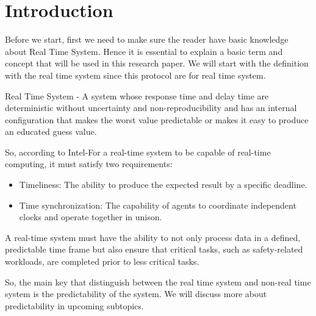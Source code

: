 \section{Introduction}

Before we start, first we need to make sure the reader have basic knowledge about Real Time System. Hence it is essential to explain a basic term and concept that will be used in this research paper. We will start with the definition with the real time system since this protocol are for real time system.\par 

Real Time System - A system whose response time and delay time are deterministic without uncertainty and non-reproducibility and has an internal configuration that makes the worst value predictable or makes it easy to produce an educated guess value\cite{b1}.\par

So, according to Intel\cite{b2}-For a real-time system to be capable of real-time computing, it must satisfy two requirements:\par
\begin{itemize}
\item Timeliness: The ability to produce the expected result by a specific deadline.
\item Time synchronization: The capability of agents to coordinate independent clocks and operate together in unison.
\end{itemize}

A real-time system must have the ability to not only process data in a defined, predictable time frame but also ensure that critical tasks, such as safety-related workloads, are completed prior to less critical tasks\cite{b2}.

So, the main key that distinguish between the real time system and non-real time system is the predictability of the system. We will discuss more about predictability in upcoming subtopics.\par



 
  
 
 





